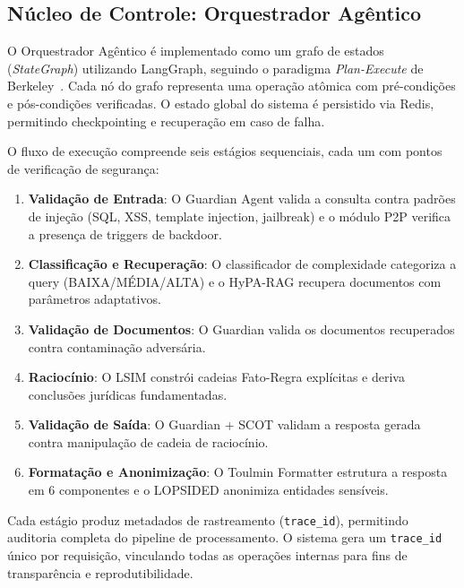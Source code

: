 \documentclass[journal,10pt]{IEEEtran}
\begin{document}
\subsection{N\'{u}cleo de Controle: Orquestrador Ag\^{e}ntico}

O Orquestrador Ag\^{e}ntico \'{e} implementado como um grafo de estados (\textit{StateGraph}) utilizando LangGraph, seguindo o paradigma \textit{Plan-Execute} de Berkeley~\cite{berkeley2025b}. Cada n\'{o} do grafo representa uma opera\c{c}\~{a}o at\^{o}mica com pr\'{e}-condi\c{c}\~{o}es e p\'{o}s-condi\c{c}\~{o}es verificadas. O estado global do sistema \'{e} persistido via Redis, permitindo checkpointing e recupera\c{c}\~{a}o em caso de falha.

O fluxo de execu\c{c}\~{a}o compreende seis est\'{a}gios sequenciais, cada um com pontos de verifica\c{c}\~{a}o de seguran\c{c}a:

\begin{enumerate}    \item \textbf{Valida\c{c}\~{a}o de Entrada}: O Guardian Agent valida a consulta contra padr\~{o}es de inje\c{c}\~{a}o (SQL, XSS, template injection, jailbreak) e o m\'{o}dulo P2P verifica a presen\c{c}a de triggers de backdoor.
    \item \textbf{Classifica\c{c}\~{a}o e Recupera\c{c}\~{a}o}: O classificador de complexidade categoriza a query (BAIXA/M\'{E}DIA/ALTA) e o HyPA-RAG recupera documentos com par\^{a}metros adaptativos.
    \item \textbf{Valida\c{c}\~{a}o de Documentos}: O Guardian valida os documentos recuperados contra contamina\c{c}\~{a}o advers\'{a}ria.
    \item \textbf{Racioc\'{i}nio}: O LSIM constr\'{o}i cadeias Fato-Regra expl\'{i}citas e deriva conclus\~{o}es jur\'{i}dicas fundamentadas.
    \item \textbf{Valida\c{c}\~{a}o de Sa\'{i}da}: O Guardian + SCOT validam a resposta gerada contra manipula\c{c}\~{a}o de cadeia de racioc\'{i}nio.
    \item \textbf{Formata\c{c}\~{a}o e Anonimiza\c{c}\~{a}o}: O Toulmin Formatter estrutura a resposta em 6 componentes e o LOPSIDED anonimiza entidades sens\'{i}veis.
\end{enumerate}

Cada est\'{a}gio produz metadados de rastreamento (\texttt{trace\_id}), permitindo auditoria completa do pipeline de processamento. O sistema gera um \texttt{trace\_id} \'{u}nico por requisi\c{c}\~{a}o, vinculando todas as opera\c{c}\~{o}es internas para fins de transparência e reprodutibilidade.
\end{document}
